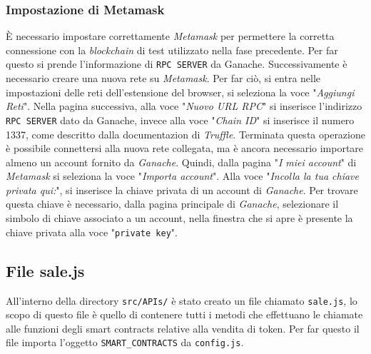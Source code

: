\documentclass[a4paper]{article}
\begin{document}
        \subsubsection{Impostazione di Metamask}
        È necessario impostare correttamente \emph{Metamask} per permettere la corretta connessione con la \emph{blockchain} di test utilizzato nella fase precedente.
        Per far questo si prende l'informazione di \verb|RPC SERVER| da Ganache. Successivamente è necessario creare una nuova rete su \emph{Metamask}. Per far ciò, si entra nelle impostazioni delle reti dell'estensione del browser, si seleziona la voce "\emph{Aggiungi Reti}".
        Nella pagina successiva, alla voce "\emph{Nuovo URL RPC}" si inserisce l'indirizzo \verb|RPC SERVER| dato da Ganache, invece alla voce "\emph{Chain ID}" si inserisce il numero 1337, come descritto dalla documentazion di \emph{Truffle}\cite{trufflechain}.
        Terminata questa operazione è possibile connettersi alla nuova rete collegata, ma è ancora necessario importare almeno un account fornito da \emph{Ganache}. Quindi, dalla pagina "\emph{I miei account}" di \emph{Metamask} si seleziona la voce "\emph{Importa account}".
        Alla voce "\emph{Incolla la tua chiave privata qui:}", si inserisce la chiave privata di un account di \emph{Ganache}. Per trovare questa chiave è necessario, dalla pagina principale di \emph{Ganache}, selezionare il simbolo di chiave associato a un account, nella finestra che si apre è presente la chiave privata alla voce "\verb|private key|".

        \subsection{File sale.js}
        All'interno della directory \verb|src/APIs/| è stato creato un file chiamato \verb|sale.js|, lo scopo di questo file è quello di contenere tutti i metodi che effettuano le chiamate alle funzioni degli smart contracts
        relative alla vendita di token. Per far questo il file importa l'oggetto \verb|SMART_CONTRACTS| da \verb|config.js|.
\end{document}
